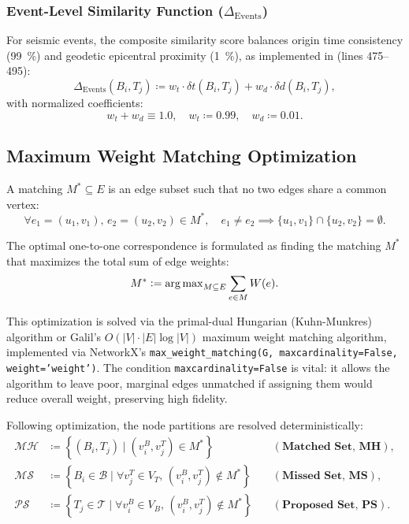 \subsubsection{Event-Level Similarity Function ($\Delta_{\mathrm{Events}}$)}
For seismic events, the composite similarity score balances origin
time consistency (\qty{99}{\percent}) and geodetic epicentral
proximity (\qty{1}{\percent}), as
implemented in  (lines 475--495):
\begin{equation}
  \Delta_{\mathrm{Events}}(B_i, T_j) \coloneqq w_t \cdot \delta t(B_i, T_j)
  + w_d \cdot \delta d(B_i, T_j),
\end{equation}
with normalized coefficients:
\begin{equation}
  w_t + w_d \equiv \num{1.0}, \quad w_t \coloneqq \num{0.99}, \quad
  w_d \coloneqq \num{0.01}.
\end{equation}

\subsection{Maximum Weight Matching Optimization}
A matching $M^* \subseteq E$ is an edge subset such that no two
edges share a common vertex:
\begin{equation}
  \forall e_1 = (u_1, v_1), \, e_2 = (u_2, v_2) \in M^*, \quad e_1
  \neq e_2 \implies \{u_1, v_1\} \cap \{u_2, v_2\} = \emptyset.
\end{equation}

The optimal one-to-one correspondence is formulated as finding the
matching $M^*$ that maximizes the total sum of edge weights:
\begin{equation}
  M^* \mathrel{\mathop:}= \operatorname{arg\,max}_{M \subseteq E} \sum_{e \in M} W(e).
\end{equation}

This optimization is solved via the primal-dual Hungarian
(Kuhn-Munkres) algorithm or Galil's $O(|V| \cdot |E| \log |V|)$
maximum weight matching algorithm, implemented via NetworkX's
\texttt{max\_weight\_matching(G, maxcardinality=False,
weight='weight')}. The condition \texttt{maxcardinality=False} is
vital: it allows the algorithm to leave poor, marginal edges
unmatched if assigning them would reduce overall weight, preserving
high fidelity.

Following optimization, the node partitions are resolved deterministically:
\begin{align}
  \mathcal{MH} & \coloneqq \left\{ (B_i, T_j) \mid (v_i^B, v_j^T) \in M^*
  \right\} \quad &(\textbf{Matched Set, MH}), \\
  \mathcal{MS} & \coloneqq \left\{ B_i \in \mathcal{B} \mid \forall v_j^T \in
  V_T, \, (v_i^B, v_j^T) \notin M^* \right\} \quad &(\textbf{Missed
  Set, MS}), \\
  \mathcal{PS} & \coloneqq \left\{ T_j \in \mathcal{T} \mid \forall v_i^B \in
  V_B, \, (v_i^B, v_j^T) \notin M^* \right\} \quad
  &(\textbf{Proposed Set, PS}).
\end{align}

